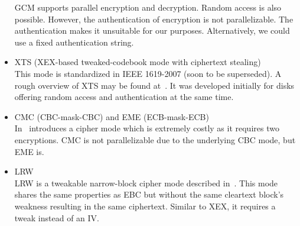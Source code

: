 \begin{itemize}
	GCM supports parallel encryption and decryption. Random access is also possible. However, the authentication of encryption is not parallelizable. The authentication makes it unsuitable for our purposes. Alternatively, we could use a fixed authentication string.
	\item XTS (XEX-based tweaked-codebook mode with ciphertext stealing)\\
	This mode is standardized in IEEE 1619-2007 (soon to be superseded). A rough overview of XTS may be found at~\cite{Martin2010}. It was developed initially for disks offering random access and authentication at the same time. 
	\item CMC (CBC-mask-CBC) and EME (ECB-mask-ECB)\\ 
	In~\cite{Halevi:2003} \citeauthor{Halevi:2003} introduces a cipher mode which is extremely costly as it requires two encryptions. CMC is not parallelizable due to the underlying CBC mode, but EME is. 
	\item LRW\\
	LRW is a tweakable narrow-block cipher mode described in~\cite{tschorsch:translayeranon}. This mode shares the same properties as EBC but without the same cleartext block's weakness resulting in the same ciphertext. Similar to XEX, it requires a tweak instead of an IV.
\end{itemize}


